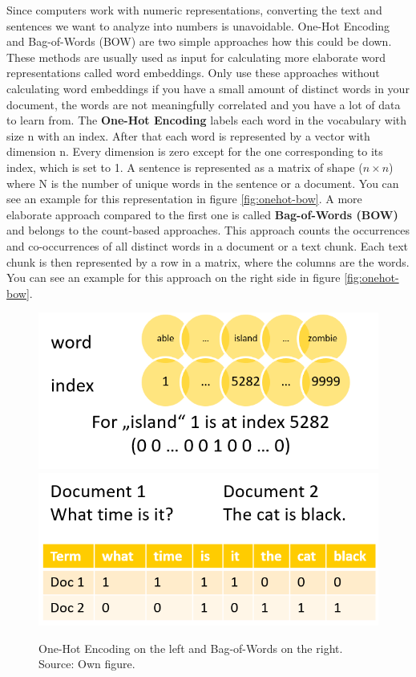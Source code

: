 \documentclass[]{krantz}
\begin{document}
Since computers work with numeric representations, converting the text and sentences we want to analyze into numbers is unavoidable. One-Hot Encoding and Bag-of-Words (BOW) are two simple approaches how this could be down. These methods are usually used as input for calculating more elaborate word representations called word embeddings. Only use these approaches without calculating word embeddings if you have a small amount of distinct words in your document, the words are not meaningfully correlated and you have a lot of data to learn from.
The \textbf{One-Hot Encoding} labels each word in the vocabulary with size n with an index. After that each word is represented by a vector with dimension n. Every dimension is zero except for the one corresponding to its index, which is set to 1. A sentence is represented as a matrix of shape (\(n\times n\)) where N is the number of unique words in the sentence or a document. You can see an example for this representation in figure \ref{fig:onehot-bow}.
A more elaborate approach compared to the first one is called \textbf{Bag-of-Words (BOW)} and belongs to the count-based approaches. This approach counts the occurrences and co-occurrences of all distinct words in a document or a text chunk. Each text chunk is then represented by a row in a matrix, where the columns are the words. You can see an example for this approach on the right side in figure \ref{fig:onehot-bow}.

\begin{figure}
\includegraphics[width=0.5\linewidth]{figures/01-01-foundations-applications-of-modern-NLP/01-01_one-hot} \includegraphics[width=0.5\linewidth]{figures/01-01-foundations-applications-of-modern-NLP/01-01_bow} \caption{One-Hot Encoding on the left and Bag-of-Words on the right. Source: Own figure.}\label{fig:onehot-bow-01-01}
\end{figure}
\end{document}
